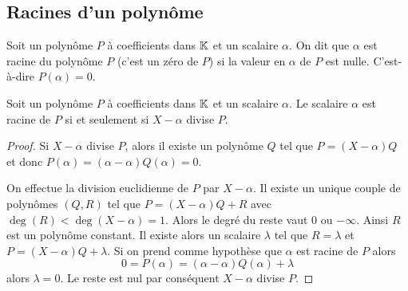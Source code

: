 \subsection{Racines d'un polynôme}

\begin{defdef}
  Soit un polynôme \(P\) à coefficients dans \(\mathbb{K}\) et un scalaire \(\alpha\). On dit que \(\alpha\) est racine du polynôme  \(P\) (c'est un zéro de \(P\)) si la valeur en \(\alpha\) de \(P\) est nulle. C'est-à-dire \(P(\alpha)=0\).
\end{defdef}

\begin{prop}
  Soit un polynôme \(P\) à coefficients dans \(\mathbb{K}\) et un scalaire \(\alpha\). Le scalaire \(\alpha\) est racine de \(P\) si et seulement si \(X-\alpha\) divise \(P\).
\end{prop}
\begin{proof}
  Si \(X-\alpha\) divise \(P\), alors il existe un polynôme \(Q\) tel que \(P=(X-\alpha)Q\) et donc \(P(\alpha)=(\alpha-\alpha)Q(\alpha)=0\).

  On effectue la division euclidienne de \(P\) par \(X-\alpha\). Il existe un unique couple de polynômes \((Q,R)\) tel que \(P=(X-\alpha)Q+R\) avec \(\deg(R) < \deg(X-\alpha)=1\). Alors le degré du reste vaut \(0\) ou \(-\infty\). Ainsi \(R\) est un polynôme constant. Il existe alors un scalaire \(\lambda\) tel que \(R=\lambda\) et \(P=(X-\alpha)Q+\lambda\). Si on prend comme hypothèse que \(\alpha\) est racine de \(P\) alors
  \begin{equation}
    0 = P(\alpha) = (\alpha-\alpha)Q(\alpha)+ \lambda
  \end{equation}
  alors \(\lambda=0\). Le reste est nul par conséquent \(X-\alpha\) divise \(P\).
\end{proof}

